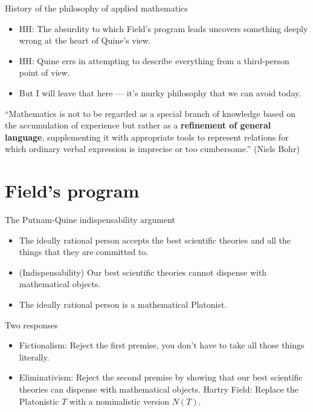 \documentclass{beamer}
\begin{document}
\begin{frame}{History of the philosophy of applied mathematics}

  \begin{itemize}
  \item HH: The absurdity to which Field's program leads uncovers
    something deeply wrong at the heart of Quine's view.
  \item HH: Quine errs in attempting to describe everything from a
    third-person point of view.
  \item But I will leave that here --- it's murky philosophy that we
    can avoid today.
  \end{itemize}

\end{frame}

\begin{frame}


  ``Mathematics is not to be regarded as a special branch of knowledge
  based on the accumulation of experience but rather as a
  \textbf{refinement of general language}, supplementing it with
  appropriate tools to represent relations for which ordinary verbal
  expression is imprecise or too cumbersome.'' (Niels Bohr)


\end{frame}

\section{Field's program}

\begin{frame}{The Putnam-Quine indispensability argument}

  \begin{itemize}
  \item The ideally rational person accepts the best scientific
    theories and all the things that they are committed to. 
  \item (Indispensability) Our best scientific theories cannot
    dispense with mathematical objects.
  \item The ideally rational person is a mathematical Platonist.
  \end{itemize}

\end{frame}

\begin{frame}{Two responses}

  \begin{itemize}
  \item Fictionalism: Reject the first premise, you don't have to take
    all those things literally.
  \item Eliminativism: Reject the second premise by showing that our
    best scientific theories can dispense with mathematical
    objects. \newline Hartry Field: Replace the Platonistic $T$ with a
    nominalistic version $N(T)$. 
  \end{itemize}

\end{frame}
\end{document}
